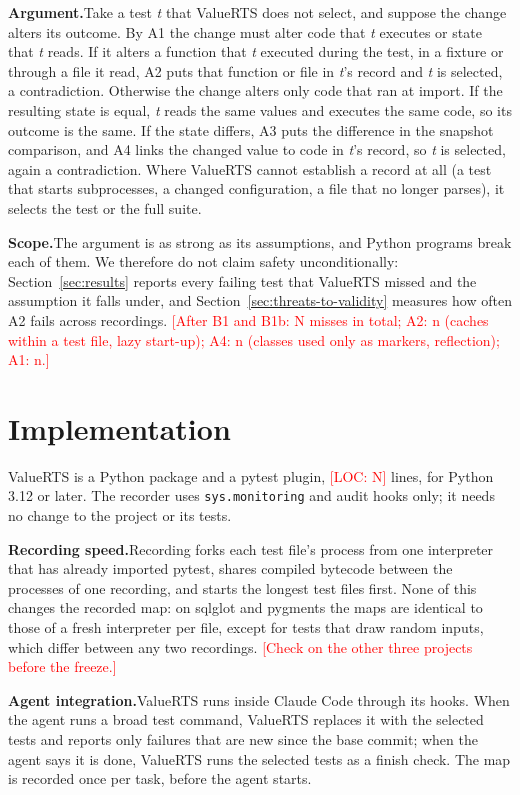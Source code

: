 \documentclass[acmsmall,screen,review,anonymous]{acmart}
\newcommand{\ph}[1]{\textcolor{red}{[#1]}}
\newcommand{\tool}{ValueRTS\xspace}
\newcommand{\para}[1]{\smallskip\noindent\textbf{#1}\hspace{0.4em}}
\begin{document}
\para{Argument.}Take a test \emph{t} that \tool does not select, and suppose the change alters its outcome. By A1 the change must alter code that \emph{t} executes or state that \emph{t} reads. If it alters a function that \emph{t} executed during the test, in a fixture or through a file it read, A2 puts that function or file in \emph{t}'s record and \emph{t} is selected, a contradiction. Otherwise the change alters only code that ran at import. If the resulting state is equal, \emph{t} reads the same values and executes the same code, so its outcome is the same. If the state differs, A3 puts the difference in the snapshot comparison, and A4 links the changed value to code in \emph{t}'s record, so \emph{t} is selected, again a contradiction. Where \tool cannot establish a record at all (a test that starts subprocesses, a changed configuration, a file that no longer parses), it selects the test or the full suite.

\para{Scope.}The argument is as strong as its assumptions, and Python programs break each of them. We therefore do not claim safety unconditionally: Section~\ref{sec:results} reports every failing test that \tool missed and the assumption it falls under, and Section~\ref{sec:threats-to-validity} measures how often A2 fails across recordings. \ph{After B1 and B1b: N misses in total; A2: n (caches within a test file, lazy start-up); A4: n (classes used only as markers, reflection); A1: n.}


\section{Implementation}\label{sec:implementation}
\tool is a Python package and a pytest plugin, \ph{LOC: N} lines, for Python 3.12 or later. The recorder uses \texttt{sys.monitoring} and audit hooks only; it needs no change to the project or its tests.

\para{Recording speed.}Recording forks each test file's process from one interpreter that has already imported pytest, shares compiled bytecode between the processes of one recording, and starts the longest test files first. None of this changes the recorded map: on sqlglot and pygments the maps are identical to those of a fresh interpreter per file, except for tests that draw random inputs, which differ between any two recordings. \ph{Check on the other three projects before the freeze.}

\para{Agent integration.}\tool runs inside Claude Code through its hooks. When the agent runs a broad test command, \tool replaces it with the selected tests and reports only failures that are new since the base commit; when the agent says it is done, \tool runs the selected tests as a finish check. The map is recorded once per task, before the agent starts.
\end{document}
